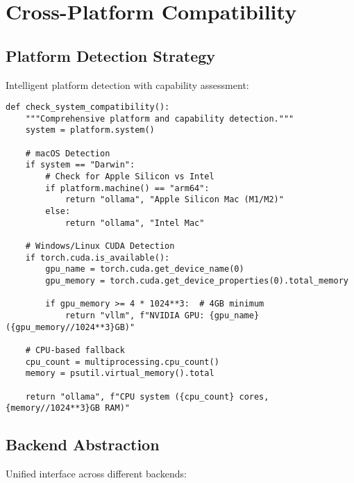 \documentclass{article}
\begin{document}
\section{Cross-Platform Compatibility}

\subsection{Platform Detection Strategy}

Intelligent platform detection with capability assessment:

\begin{lstlisting}[caption=Platform Detection Implementation]
def check_system_compatibility():
    """Comprehensive platform and capability detection."""
    system = platform.system()

    # macOS Detection
    if system == "Darwin":
        # Check for Apple Silicon vs Intel
        if platform.machine() == "arm64":
            return "ollama", "Apple Silicon Mac (M1/M2)"
        else:
            return "ollama", "Intel Mac"

    # Windows/Linux CUDA Detection
    if torch.cuda.is_available():
        gpu_name = torch.cuda.get_device_name(0)
        gpu_memory = torch.cuda.get_device_properties(0).total_memory

        if gpu_memory >= 4 * 1024**3:  # 4GB minimum
            return "vllm", f"NVIDIA GPU: {gpu_name} ({gpu_memory//1024**3}GB)"

    # CPU-based fallback
    cpu_count = multiprocessing.cpu_count()
    memory = psutil.virtual_memory().total

    return "ollama", f"CPU system ({cpu_count} cores, {memory//1024**3}GB RAM)"
\end{lstlisting}

\subsection{Backend Abstraction}

Unified interface across different backends:
\end{document}
